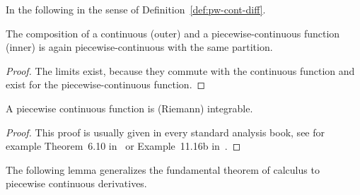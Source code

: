     In the following
    in the sense of Definition~\ref{def:pw-cont-diff}.

    \begin{lemma}
        The composition of a continuous (outer) and a piecewise-continuous function (inner) is again piecewise-continuous with the same partition.
    \end{lemma}
    \begin{proof}
        The limits exist, because they commute with the continuous function and exist for the piecewise-continuous function.
    \end{proof}

    \begin{lemma}\label{lm:pc-integrable}
        A piecewise continuous function is (Riemann) integrable.
    \end{lemma}
    \begin{proof}
        This proof is usually given in every standard analysis book, see for example Theorem~6.10 in~\cite{Rudin76PrinciplesAnalysis} or Example~11.16b in~\cite{Gathmann12GDM}.
    \end{proof}

    The following lemma generalizes the fundamental theorem of calculus to piecewise continuous derivatives.

